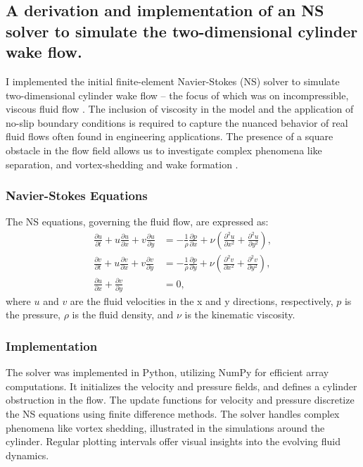 \subsection{A derivation and implementation of an NS solver to simulate the two-dimensional cylinder wake flow.}

I implemented the initial finite-element Navier-Stokes (NS) solver \cite{Batchelor2000} to simulate two-dimensional cylinder wake flow -- the focus of which was on incompressible, viscous fluid flow \cite{Pope2000}. The inclusion of viscosity in the model and the application of no-slip boundary conditions \cite{White2006} is required to capture the nuanced behavior of real fluid flows often found in engineering applications. The presence of a square obstacle in the flow field allows us to investigate complex phenomena like separation, and vortex-shedding and wake formation \cite{Zdravkovich1997,Anderson1995}.

\subsubsection{Navier-Stokes Equations}
The NS equations, governing the fluid flow, are expressed as:
\begin{align}
    \frac{\partial u}{\partial t} + u \frac{\partial u}{\partial x} + v \frac{\partial u}{\partial y} &= -\frac{1}{\rho} \frac{\partial p}{\partial x} + \nu \left( \frac{\partial^2 u}{\partial x^2} + \frac{\partial^2 u}{\partial y^2} \right), \\
    \frac{\partial v}{\partial t} + u \frac{\partial v}{\partial x} + v \frac{\partial v}{\partial y} &= -\frac{1}{\rho} \frac{\partial p}{\partial y} + \nu \left( \frac{\partial^2 v}{\partial x^2} + \frac{\partial^2 v}{\partial y^2} \right), \\
    \frac{\partial u}{\partial x} + \frac{\partial v}{\partial y} &= 0,
\end{align}
where \( u \) and \( v \) are the fluid velocities in the x and y directions, respectively, \( p \) is the pressure, \( \rho \) is the fluid density, and \( \nu \) is the kinematic viscosity.

\subsubsection{Implementation}
The solver was implemented in Python, utilizing NumPy for efficient array computations. It initializes the velocity and pressure fields, and defines a cylinder obstruction in the flow. The update functions for velocity and pressure discretize the NS equations using finite difference methods. The solver handles complex phenomena like vortex shedding, illustrated in the simulations around the cylinder. Regular plotting intervals offer visual insights into the evolving fluid dynamics.

